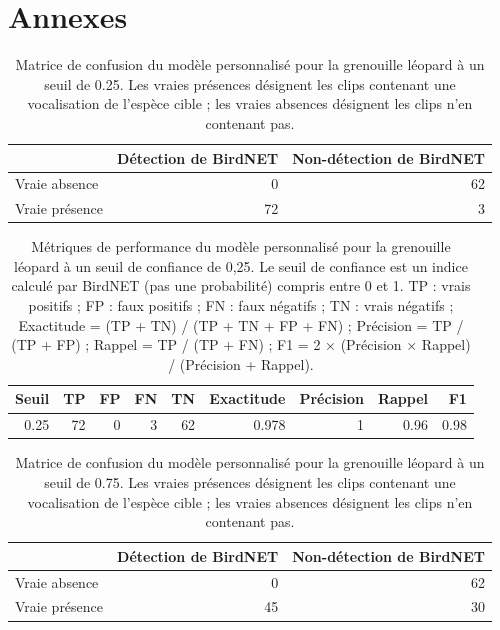 \section*{Annexes}



\begin{table}[H]
\centering
\caption{Matrice de confusion du modèle personnalisé pour la grenouille léopard à un seuil de 0.25. Les vraies présences désignent les clips contenant une vocalisation de l'espèce cible ; les vraies absences désignent les clips n'en contenant pas.}
\label{tab:tab_confusion_pipiens}
\begin{tabular}{lrr}
  \hline
 & Détection de BirdNET & Non-détection de BirdNET \\
  \hline
Vraie absence  &  0 & 62 \\
Vraie présence & 72 &  3 \\
  \hline
\end{tabular}
\end{table}

\begin{table}[H]
\centering
\caption{Métriques de performance du modèle personnalisé pour la grenouille léopard à un seuil de confiance de 0,25. Le seuil de confiance est un indice calculé par BirdNET (pas une probabilité) compris entre 0 et 1. TP : vrais positifs ; FP : faux positifs ; FN : faux négatifs ; TN : vrais négatifs ; Exactitude = (TP + TN) / (TP + TN + FP + FN) ; Précision = TP / (TP + FP) ; Rappel = TP / (TP + FN) ; F1 = 2 × (Précision × Rappel) / (Précision + Rappel).}
\label{tab:tab_metrics_pipiens_025}
\begin{tabular}{rrrrrrrrr}
  \hline
Seuil & TP & FP & FN & TN & Exactitude & Précision & Rappel & F1 \\
  \hline
0.25 & 72 & 0 & 3 & 62 & 0.978 & 1 & 0.96 & 0.98 \\
  \hline
\end{tabular}
\end{table}

\begin{table}[H]
\centering
\caption{Matrice de confusion du modèle personnalisé pour la grenouille léopard à un seuil de 0.75. Les vraies présences désignent les clips contenant une vocalisation de l'espèce cible ; les vraies absences désignent les clips n'en contenant pas.}
\label{tab:tab_confusion_pipiens_075}
\begin{tabular}{lrr}
  \hline
 & Détection de BirdNET & Non-détection de BirdNET \\
  \hline
Vraie absence  &  0 & 62 \\
Vraie présence & 45 & 30 \\
  \hline
\end{tabular}
\end{table}

